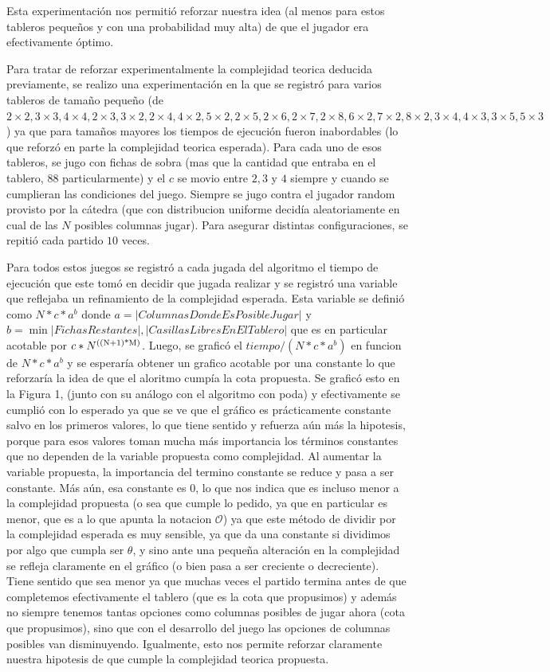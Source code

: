 \documentclass[A4paper,oneside,fleqn,11pt]{article}
\theoremstyle{definition}
\begin{document}
Esta experimentación nos permitió reforzar nuestra idea (al menos para estos tableros pequeños y con una probabilidad muy alta) de que el jugador era efectivamente óptimo.

Para tratar de reforzar experimentalmente la complejidad teorica deducida previamente, se realizo una experimentación en la que se registró para varios tableros de tamaño pequeño (de $2\times2, 3\times3, 4\times4, 2\times3, 3\times2, 2\times4, 4\times2, 5\times2, 2\times5, 2\times6, 2\times7, 2\times8, 6\times2, 7\times2, 8\times2, 3\times4, 4\times3, 3\times5, 5\times3$) ya que para tamaños mayores los tiempos de ejecución fueron inabordables (lo que reforzó en parte la complejidad teorica esperada). Para cada uno de esos tableros, se jugo con fichas de sobra (mas que la cantidad que entraba en el tablero, 88 particularmente) y el $c$ se movio entre $2, 3$ y $4$ siempre y cuando se cumplieran las condiciones del juego. Siempre se jugo contra el jugador random provisto por la cátedra (que con distribucion uniforme decidía aleatoriamente en cual de las $N$ posibles columnas jugar). Para asegurar distintas configuraciones, se repitió cada partido $10$ veces. 


Para todos estos juegos se registró a cada jugada del algoritmo el tiempo de ejecución que este tomó en decidir que jugada realizar y se registró una variable que reflejaba un refinamiento de la complejidad esperada. Esta variable se definió como $N*c*a^b$ donde $a=|Columnas Donde Es Posible Jugar|$ y $b =\min{|FichasRestantes|,|Casillas Libres En El Tablero|}$ que es en particular acotable por $c*N\textsuperscript{((N+1)*M)}$. Luego, se graficó el $tiempo/(N*c*a^b)$ en funcion de $N*c*a^b$ y se esperaría obtener un grafico acotable por una constante lo que reforzaría la idea de que el aloritmo cumpía la cota propuesta. Se graficó esto en la Figura 1, (junto con su análogo con el algoritmo con poda) y efectivamente se cumplió con lo esperado ya que se ve que el gráfico es prácticamente constante salvo en los primeros valores, lo que tiene sentido y refuerza aún más la hipotesis, porque para esos valores toman mucha más importancia los términos constantes que no dependen de la variable propuesta como complejidad. Al aumentar la variable propuesta, la importancia del termino constante se reduce y pasa a ser constante. Más aún, esa constante es $0$, lo que nos indica que es incluso menor a la complejidad propuesta (o sea que cumple lo pedido, ya que en particular es menor, que es a lo que apunta la notacion $\mathcal{O}$) ya que este método de dividir por la complejidad esperada es muy sensible, ya que da una constante si dividimos por algo que cumpla ser $\mathcal{\theta}$, y sino ante una pequeña alteración en la complejidad se refleja claramente en el gráfico (o bien pasa a ser creciente o decreciente). Tiene sentido que sea menor ya que muchas veces el partido termina antes de que completemos efectivamente el tablero (que es la cota que propusimos) y además no siempre tenemos tantas opciones como columnas posibles de jugar ahora (cota que propusimos), sino que con el desarrollo del juego las opciones de columnas posibles van disminuyendo. Igualmente, esto nos permite reforzar claramente nuestra hipotesis de que cumple la complejidad teorica propuesta.
\end{document}
